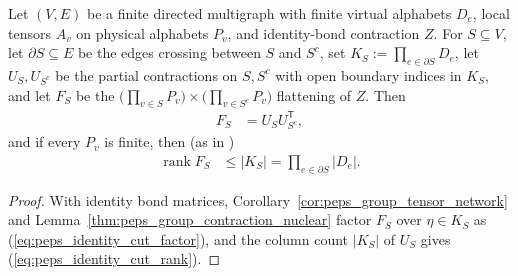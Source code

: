 \begin{lemma}
    \label{thm:peps_identity_cut_factorization}
    \leanok
    Let $(V,E)$ be a finite directed multigraph with finite virtual alphabets $D_e$, local tensors $A_v$ on physical alphabets $P_v$, and identity-bond contraction $Z$.
    For $S\subseteq V$, let $\partial S\subseteq E$ be the edges crossing between $S$ and $S^c$, set $K_S:=\prod_{e\in\partial S}D_e$, let $U_S,U_{S^c}$ be the partial contractions on $S,S^c$ with open boundary indices in $K_S$, and let $F_S$ be the $\bigl(\prod_{v\in S}P_v\bigr)\times\bigl(\prod_{v\in S^c}P_v\bigr)$ flattening of $Z$. Then
    \begin{align}
        F_S & =U_S U_{S^c}^{\mathsf T},
        \label{eq:peps_identity_cut_factor}
    \end{align}
    and if every $P_v$ is finite, then (as in \cite[Part~II, proof of Theorem~B]{TNLean2026OneDimensional})
    \begin{align}
        \operatorname{rank}F_S
         & \le |K_S|=\prod_{e\in\partial S}|D_e|.
        \label{eq:peps_identity_cut_rank}
    \end{align}
\end{lemma}

\begin{proof}\leanok
    With identity bond matrices, Corollary~\ref{cor:peps_group_tensor_network} and Lemma~\ref{thm:peps_group_contraction_nuclear} factor $F_S$ over $\eta\in K_S$ as (\ref{eq:peps_identity_cut_factor}), and the column count $|K_S|$ of $U_S$ gives (\ref{eq:peps_identity_cut_rank}).
\end{proof}

